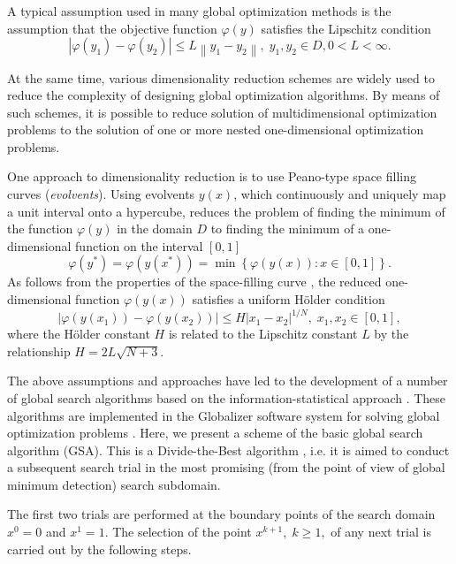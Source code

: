 \documentclass{aip-cp}
\begin{document}
A typical assumption used in many global optimization methods \cite{Sergeyev2013,Evtushenko2013,Jones2009,Zilinskas2010,Pinter1996,Grishagin2016_1,Sergeyev2021} is the assumption that the objective function $\varphi(y)$ satisfies the Lipschitz condition
\[
\left|\varphi(y_1)-\varphi(y_2)\right|\leq L\left\|y_1-y_2\right\|,\; y_1,y_2 \in D, 0<L<\infty.
\]

At the same time, various dimensionality reduction schemes are widely used to reduce the complexity of designing global optimization algorithms. By means of  such schemes, it is possible to reduce solution of multidimensional optimization problems to the solution of one or more nested one-dimensional optimization problems.

One approach to dimensionality reduction is to use Peano-type space filling curves (\textit{evolvents}). Using evolvents $y(x)$, which continuously and uniquely map a unit interval onto a hypercube, reduces the problem of finding the minimum of the function $\varphi(y)$ in the domain $D$ to finding the minimum of a one-dimensional function  on the interval $[0,1]$
\[
\varphi(y^\ast)=\varphi(y(x^\ast))=\min{\left\{\varphi(y(x)): x\in[0,1]\right\}}.
\]
As follows from the properties of the space-filling curve \cite{Sergeyev2013}, the reduced one-dimensional function $\varphi(y(x))$ satisfies a uniform H{\"o}lder condition
\[
\left|\varphi(y(x_1))-\varphi(y(x_2))\right|\leq H\left|x_1-x_2\right|^{1/N}, \; x_1,x_2 \in [0,1],
\]
where the H{\"o}lder constant $H$ is related to the Lipschitz constant $L$ by the relationship $H=2L\sqrt{N+3}$.

The above assumptions and approaches have led to the development of a number of global search algorithms based on the information-statistical approach \cite{Strongin2000}. These algorithms are implemented in the Globalizer software system for solving global optimization problems \cite{globalizerSystem}. Here, we present a scheme of the basic global search algorithm (GSA). This is a Divide-the-Best algorithm \cite{Sergeyev1998}, i.e. it is aimed to conduct a subsequent search trial in the most promising (from the point of view of global minimum detection) search subdomain.

The first two trials are performed at the boundary points of the search domain $x^0 = 0$ and $x^1 = 1$. The selection of the point  $x^{k+1}, \; k \geq 1,$  of any next trial is carried out by the following steps.
\end{document}
